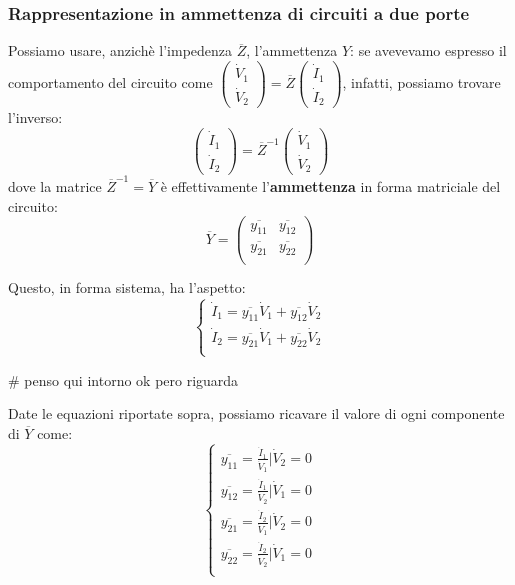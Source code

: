 \documentclass[a4paper,11pt]{article}
\begin{document}
\subsubsection{Rappresentazione in ammettenza di circuiti a due porte}
Possiamo usare, anzichè l'impedenza $\overline{Z}$, l'ammettenza $Y$: se avevevamo espresso il comportamento del circuito come $
\begin{pmatrix}
	\dot{V}_1 \\ \dot{V}_2
\end{pmatrix}
= \overline{Z}
\begin{pmatrix}
	\dot{I}_1 \\ \dot{I}_2
\end{pmatrix}
$, infatti, possiamo trovare l'inverso:
$$
\begin{pmatrix}
	\dot{I}_1 \\ \dot{I}_2
\end{pmatrix}
= \overline{Z}^{-1}
\begin{pmatrix}
	\dot{V}_1 \\ \dot{V}_2
\end{pmatrix}
$$
dove la matrice $\overline{Z}^{-1} = \overline{Y}$ è effettivamente l'\textbf{ammettenza} in forma matriciale del circuito:
$$
\overline{Y} =
\begin{pmatrix}
	\overline{y_{11}} & \overline{y_{12}} \\ 
	\overline{y_{21}} & \overline{y_{22}} \\ 
\end{pmatrix}
$$

Questo, in forma sistema, ha l'aspetto:
\[
	\begin{cases}
		\dot{I}_1 = \overline{y_{11}} \dot{V}_1 + \overline{y_{12}} \dot{V}_2 \\ 	
		\dot{I}_2 = \overline{y_{21}} \dot{V}_1 + \overline{y_{22}} \dot{V}_2 \\ 	
	\end{cases}
\]

# penso qui intorno ok pero riguarda

Date le equazioni riportate sopra, possiamo ricavare il valore di ogni componente di $\overline{Y}$ come:
\[
	\begin{cases}
		\overline{y_{11}} = \frac{\dot{I}_1}{\dot{V}_1} \Big| \dot{V}_2 = 0 \\
		\overline{y_{12}} = \frac{\dot{I}_1}{\dot{V}_2} \Big| \dot{V}_1 = 0 \\
		\overline{y_{21}} = \frac{\dot{I}_2}{\dot{V}_1} \Big| \dot{V}_2 = 0 \\
		\overline{y_{22}} = \frac{\dot{I}_2}{\dot{V}_2} \Big| \dot{V}_1 = 0 \\
	\end{cases}
\]
\end{document}
